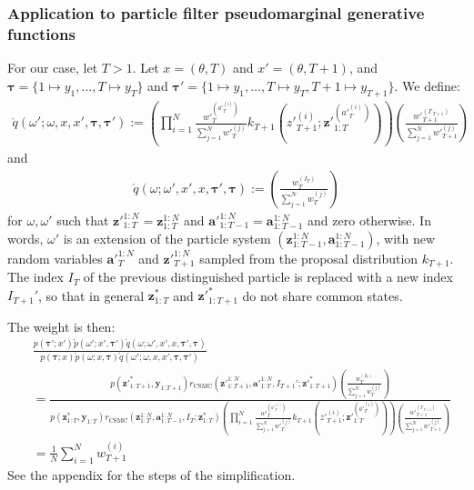 \documentclass[11pt]{article}
\newcommand{\z}{\mathbf{z}}
\newcommand{\abold}{\mathbf{a}}
\newcommand{\y}{\mathbf{y}}
\newcommand\tdict[0]{\boldsymbol{\tau}}
\begin{document}
\subsubsection{Application to particle filter pseudomarginal generative functions}
For our case, let $T > 1$.
Let $x = (\theta, T)$ and $x' = (\theta, T+1)$, and 
$\tdict = \{1 \mapsto y_1, \ldots, T \mapsto y_T\}$ and 
$\tdict' = \{1 \mapsto y_1, \ldots, T \mapsto y_T, T + 1 \mapsto y_{T+1}\}$.
We define:
\begin{align*}
 \mathring{q}(\omega'; \omega, x, x', \tdict, \tdict')
    := \left( \prod_{i=1}^N \frac{{w'}_{T}^{({a'}_{T}^{(i)})}}{\sum_{j=1}^N {w'}_{T}^{(j)}} k_{T+1}({z'}_{T+1}^{(i)}; {\z'}_{1:T}^{({a'}_{T}^{(i)})} ) \right)
        \left( \frac{{w'}_{T+1}^{(I'_{T+1})}}{\sum_{j=1}^N {w'}_{T+1}^{(j)}} \right)
\end{align*}
and 
\begin{align*}
 \mathring{q}(\omega; \omega', x', x, \tdict', \tdict)
    := \left( \frac{{w}_{T}^{(I_{T})}}{\sum_{j=1}^N {w}_{T}^{(j)}} \right)
\end{align*}
for $\omega, \omega'$ such that
${\z'}_{1:T}^{1:N} = {\z}_{1:T}^{1:N}$ and 
${\abold'}_{1:T-1}^{1:N} = {\abold}_{1:T-1}^{1:N}$
and zero otherwise.
In words, $\omega'$ is an extension of the particle system $(\z_{1:T-1}^{1:N}, \abold_{1:T-1}^{1:N})$, with new random variables ${\abold'}_{T}^{1:N}$ and ${\z'}_{T+1}^{1:N}$ sampled from the proposal distribution $k_{T+1}$.
The index $I_T$ of the previous distinguished particle is replaced with a new index $I_{T+1}'$, so that in general $\z_{1:T}^{*}$ and ${\z'}_{1:T+1}^{*}$ do not share common states.

The weight is then:
\begin{align*}
& \frac{p(\tdict'; x') \mathring{p}(\omega'; x', \tdict')\mathring{q}(\omega; \omega', x', x, \tdict', \tdict)}
{p(\tdict; x) \mathring{p}(\omega; x, \tdict) \mathring{q}(\omega'; \omega, x, x', \tdict, \tdict')}\\
&= \frac{
    p({\z'}_{1:T+1}^*, \y_{1:T+1})
    r_{\mathrm{CSMC}}({\z'}_{1:T+1}^{1:N}, {\abold'}_{1:T}^{1:N}, I_{T+1}'; {\z'}_{1:T+1}^*)
    \left( \frac{{w}_{T}^{(I_{T})}}{\sum_{j=1}^N {w}_{T}^{(j)}} \right)
}{
    p(\z_{1:T}^*, \y_{1:T})
    r_{\mathrm{CSMC}}(\z_{1:T}^{1:N}, \abold_{1:T-1}^{1:N}, I_T; \z_{1:T}^*)
    \left( \prod_{i=1}^N \frac{{w'}_{T}^{({a'}_{T}^{(i)})}}{\sum_{j=1}^N {w'}_{T}^{(j)}} k_{T+1}({z'}_{T+1}^{(i)}; {\z'}_{1:T}^{({a'}_{T}^{(i)})} ) \right)
    \left( \frac{{w'}_{T+1}^{(I'_{T+1})}}{\sum_{j=1}^N {w'}_{T+1}^{(j)}} \right)
}\\
&= \frac{1}{N} \sum_{i=1}^N w_{T+1}^{(i)}
\end{align*}
See the appendix for the steps of the simplification.
\end{document}
